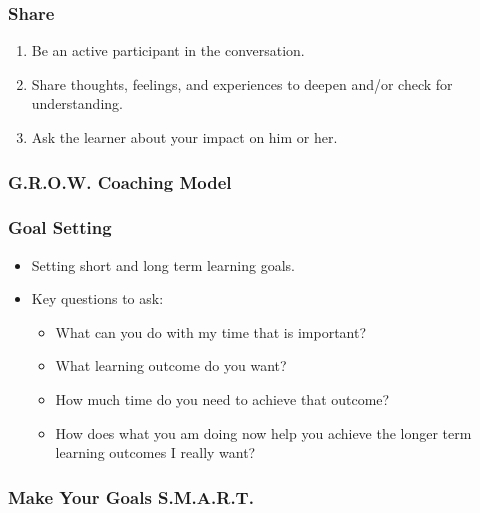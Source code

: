 \documentclass[
]{book}
\providecommand{\tightlist}{%
  \setlength{\itemsep}{0pt}\setlength{\parskip}{0pt}}
\begin{document}
\hypertarget{share}{%
\subsubsection*{Share}\label{share}}

\begin{enumerate}
\def\labelenumi{\arabic{enumi}.}
\tightlist
\item
  Be an active participant in the conversation.
\item
  Share thoughts, feelings, and experiences to deepen and/or check for understanding.
\item
  Ask the learner about your impact on him or her.
\end{enumerate}

\hypertarget{g.r.o.w.-coaching-model}{%
\subsubsection*{G.R.O.W. Coaching Model}\label{g.r.o.w.-coaching-model}}

\hypertarget{goal-setting}{%
\subsubsection*{Goal Setting}\label{goal-setting}}

\begin{itemize}
\tightlist
\item
  Setting short and long term learning goals.
\item
  Key questions to ask:

  \begin{itemize}
  \tightlist
  \item
    What can you do with my time that is important?
  \item
    What learning outcome do you want?
  \item
    How much time do you need to achieve that outcome?
  \item
    How does what you am doing now help you achieve the longer term learning outcomes I really want?
  \end{itemize}
\end{itemize}

\hypertarget{make-your-goals-s.m.a.r.t.}{%
\subsubsection*{Make Your Goals S.M.A.R.T.}\label{make-your-goals-s.m.a.r.t.}}
\end{document}
